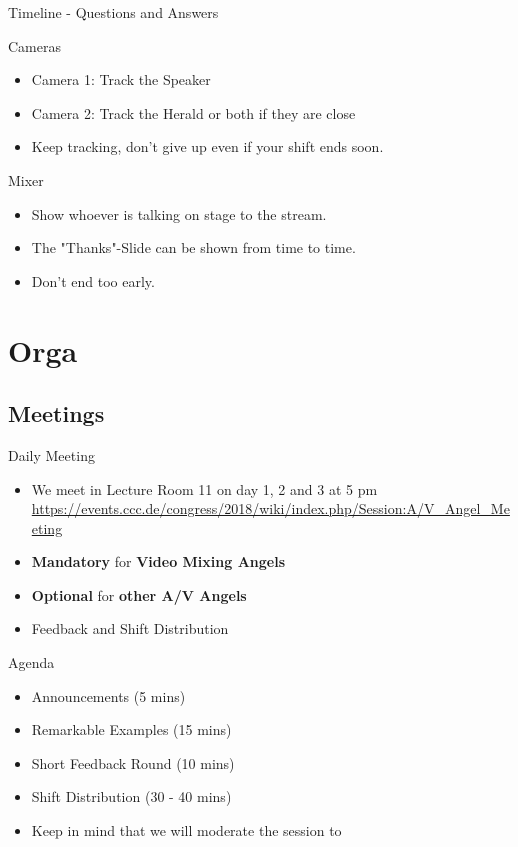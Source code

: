 \documentclass[aspectratio=169]{beamer}
\begin{document}
\begin{frame}{Timeline - Questions and Answers}
	\begin{block}{Cameras}
		\begin{itemize}
			\item Camera 1: Track the Speaker
			\item Camera 2: Track the Herald or both if they are close
			\item Keep tracking, don't give up even if your shift ends soon.
		\end{itemize}
	\end{block}
	
	\begin{block}{Mixer}
		\begin{itemize}
			\item Show whoever is talking on stage to the stream.
			\item The "Thanks"-Slide can be shown from time to time.
			\item Don't end too early.
		\end{itemize}
	\end{block}
\end{frame}

\section{Orga} 				%
\subsection{Meetings}
\begin{frame}{Daily Meeting}
\begin{itemize}
	\item We meet in Lecture Room 11 on day 1, 2 and 3 at 5 pm \\
	\renewcommand\UrlFont{\color{blue}\sffamily\textbf}
	\url{https://events.ccc.de/congress/2018/wiki/index.php/Session:A/V_Angel_Meeting}
	\item  \textbf{Mandatory} for \textbf{Video Mixing Angels}
	\item  \textbf{Optional} for \textbf{other A/V Angels}
	\item  Feedback and Shift Distribution
\end{itemize} 
\end{frame}


\begin{frame}{Agenda}		%
\begin{itemize}
	\item Announcements (5 mins)
	\item Remarkable Examples (15 mins)
	\item Short Feedback Round (10 mins)
	\item Shift Distribution (30 - 40 mins)
	\item Keep in mind that we will moderate the session to 
\end{itemize} 
\end{frame}
\end{document}
